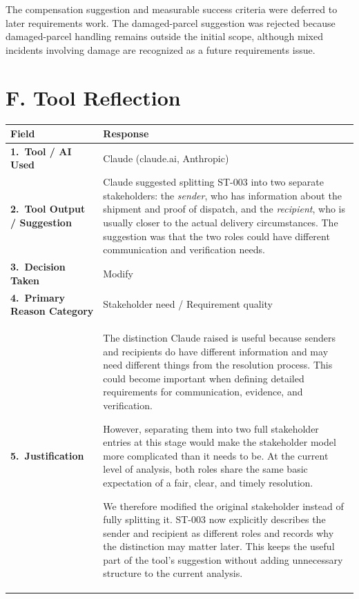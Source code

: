 \documentclass[11pt,a4paper]{article}
\begin{document}
The compensation suggestion and measurable success criteria were
deferred to later requirements work. The damaged-parcel suggestion
was rejected because damaged-parcel handling remains outside the
initial scope, although mixed incidents involving damage are
recognized as a future requirements issue.



\section{F. Tool Reflection}

\renewcommand{\arraystretch}{1.6}
\noindent
\begin{tabular}{@{} p{4.2cm} p{10.3cm} @{}}
\hline
\textbf{Field} & \textbf{Response} \\
\hline

\textbf{1.\ Tool / AI Used}
&
Claude (claude.ai, Anthropic) \\[0.4em]

\textbf{2.\ Tool Output / Suggestion}
&
Claude suggested splitting ST-003 into two separate stakeholders:
the \textit{sender}, who has information about the shipment and
proof of dispatch, and the \textit{recipient}, who is usually closer
to the actual delivery circumstances. The suggestion was that the
two roles could have different communication and verification needs.
\\[0.4em]

\textbf{3.\ Decision Taken}
&
Modify \\[0.4em]

\textbf{4.\ Primary Reason Category}
&
Stakeholder need / Requirement quality \\[0.4em]

\textbf{5.\ Justification}
&
The distinction Claude raised is useful because senders and
recipients do have different information and may need different
things from the resolution process. This could become important
when defining detailed requirements for communication, evidence,
and verification.

However, separating them into two full stakeholder entries at this
stage would make the stakeholder model more complicated than it
needs to be. At the current level of analysis, both roles share the
same basic expectation of a fair, clear, and timely resolution.

We therefore modified the original stakeholder instead of fully
splitting it. ST-003 now explicitly describes the sender and
recipient as different roles and records why the distinction may
matter later. This keeps the useful part of the tool's suggestion
without adding unnecessary structure to the current analysis.
\\[0.4em]

\hline
\end{tabular}
\end{document}
